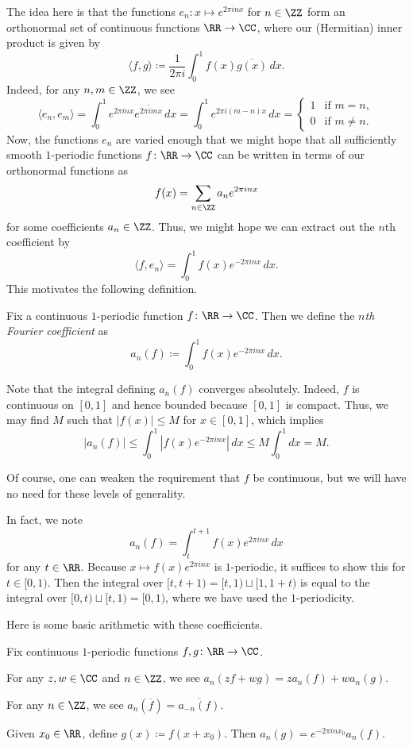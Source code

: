 \documentclass[notes.tex]{subfiles}
\begin{document}
The idea here is that the functions $e_n\colon x\mapsto e^{2\pi inx}$ for $n\in\ZZ$ form an orthonormal set of continuous functions $\RR\to\CC$, where our (Hermitian) inner product is given by
\[\langle f,g\rangle\coloneqq\frac1{2\pi i}\int_0^1f(x)\overline{g(x)}\,dx.\]
Indeed, for any $n,m\in\ZZ$, we see
\begin{equation}
	\langle e_n,e_m\rangle=\int_0^1e^{2\pi inx}\overline{e^{2\pi imx}}\,dx=\int_0^1e^{2\pi i(m-n)x}\,dx=\begin{cases}
		1 & \text{if }m=n, \\
		0 & \text{if }m\ne n.
	\end{cases} \label{eq:exps-are-orthonormal}
\end{equation}
Now, the functions $e_n$ are varied enough that we might hope that all sufficiently smooth $1$-periodic functions $f\colon\RR\to\CC$ can be written in terms of our orthonormal functions as
\[f(x)=\sum_{n\in\ZZ}a_ne^{2\pi inx}\]
for some coefficients $a_n\in\ZZ$. Thus, we might hope we can extract out the $n$th coefficient by
\[\langle f,e_n\rangle=\int_0^1f(x)e^{-2\pi inx}\,dx.\]
This motivates the following definition.
\begin{definition}
	Fix a continuous $1$-periodic function $f\colon\RR\to\CC$. Then we define the \textit{$n$th Fourier coefficient} as
	\[a_n(f)\coloneqq\int_0^1f(x)e^{-2\pi inx}\,dx.\]
\end{definition}
\begin{remark} \label{rem:bound-coefs}
	Note that the integral defining $a_n(f)$ converges absolutely. Indeed, $f$ is continuous on $[0,1]$ and hence bounded because $[0,1]$ is compact. Thus, we may find $M$ such that $|f(x)|\le M$ for $x\in[0,1]$, which implies
	\[|a_n(f)|\le\int_0^1\left|f(x)e^{-2\pi inx}\right|\,dx\le M\int_0^1dx=M.\]
\end{remark}
Of course, one can weaken the requirement that $f$ be continuous, but we will have no need for these levels of generality.
\begin{remark} \label{rem:shift-integration}
	In fact, we note
	\[a_n(f)=\int_t^{t+1}f(x)e^{2\pi inx}\,dx\]
	for any $t\in\RR$. Because $x\mapsto f(x)e^{2\pi inx}$ is $1$-periodic, it suffices to show this for $t\in[0,1)$. Then the integral over $[t,t+1)=[t,1)\sqcup[1,1+t)$ is equal to the integral over $[0,t)\sqcup[t,1)=[0,1)$, where we have used the $1$-periodicity.
\end{remark}
Here is some basic arithmetic with these coefficients.
\begin{lemma} \label{lem:linearity-of-fourier-coefs}
	Fix continuous $1$-periodic functions $f,g\colon\RR\to\CC$.
	\begin{listalph}
		\item For any $z,w\in\CC$ and $n\in\ZZ$, we see $a_n(zf+wg)=za_n(f)+wa_n(g)$.
		\item For any $n\in\ZZ$, we see $a_n(\overline f)=\overline{a_{-n}(f)}$.
		\item Given $x_0\in\RR$, define $g(x)\coloneqq f(x+x_0)$. Then $a_n(g)=e^{-2\pi inx_0}a_n(f)$.
	\end{listalph}
\end{lemma}
\end{document}
